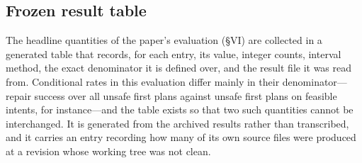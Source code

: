 \subsection{Frozen result table}

The headline quantities of the paper's evaluation (\S VI) are collected in a
generated table that records, for each entry, its value, integer counts,
interval method, the exact denominator it is defined over, and the result
file it was read from. Conditional rates in this evaluation differ mainly in
their denominator---repair success over all unsafe first plans against unsafe
first plans on feasible intents, for instance---and the table exists so that
two such quantities cannot be interchanged. It is generated from the archived
results rather than transcribed, and it carries an entry recording how many
of its own source files were produced at a revision whose working tree was
not clean.

